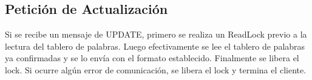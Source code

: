 \documentclass[a4,11pt]{article}
\begin{document}
\subsection{Petición de Actualización}

Si se recibe un mensaje de UPDATE, primero se realiza un ReadLock previo a la lectura del tablero de palabras. Luego efectivamente se lee el tablero de palabras ya confirmadas y se lo envía con el formato establecido.
Finalmente se libera el lock.
Si ocurre algún error de comunicación, se libera el lock y termina el cliente.
\end{document}
